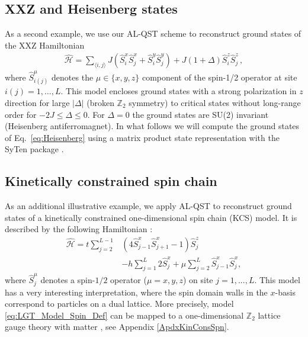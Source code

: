 \documentclass[pra,aps,showpacs,groupedaddress,superscriptaddress,twocolumn,toc=flat,biblatex,footinbib]{revtex4-1}
\renewcommand{\l}{\left(}
\renewcommand{\r}{\right)}
\renewcommand{\H}{\hat{\mathcal{H}}}
\newcommand{\Zt}{$\mathbb{Z}_2$ }
\begin{document}

\subsection{XXZ and Heisenberg states}
As a second example, we use our AL-QST scheme to reconstruct ground states of the XXZ Hamiltonian
\begin{align}
\hat{\mathcal{H}} = \sum_{\langle i,j\rangle} J (\hat{S}_i^x \hat{S}_j^x+\hat{S}_i^y\hat{S}_j^y)+J(1+\Delta)\hat{S}_i^z\hat{S}_j^z\,,
\label{eq:Heisenberg}
\end{align}
where $\hat{S}_{i(j)}^{\mu}$ denotes the $\mu\in \{x,y,z\}$ component of the spin-1/2 operator at site $i(j) =1,\dots ,L $. This model encloses ground states with a strong polarization in $z$ direction for large 
$\vert \Delta\vert$ (broken \Zt symmetry) to critical states without 
long-range order for $-2J \leq \Delta\leq 0$. For $\Delta=0$ the ground states are SU(2) invariant (Heisenberg antiferromagnet). In what follows we will compute the ground states of Eq.~\eqref{eq:Heisenberg} using a matrix product state representation with the SyTen package \cite{syten1, syten2}.

\subsection{Kinetically constrained spin chain}
As an additional illustrative example, we apply AL-QST to reconstruct ground states of a kinetically constrained one-dimensional spin chain (KCS) model. It is described by the following Hamiltonian \cite{Iadecola2020,Borla2020,Kebric2021}:
\begin{align}
    \H = t \sum_{j=2}^{L-1} &\l 4 \hat{S}^{x}_{j-1} \hat{S}^{x}_{j+1} - 1 \r \hat{S}^{z}_j \nonumber \\
    &- h \sum_{j=1}^{L} 2 \hat{S}^{x}_{j}
    + \mu \sum_{j=2}^{L} \hat{S}^{x}_{j-1} \hat{S}^{x}_{j},
    \label{eq:LGT_Model_Spin_Def}
\end{align}
where $\hat{S}^\mu_j$ denotes a spin-$1/2$ operator ($\mu=x,y,z$) on site $j=1,...,L$. This model has a very interesting interpretation, where the spin domain walls in the $x$-basis correspond to particles on a dual lattice.
More precisely, model \eqref{eq:LGT_Model_Spin_Def} can be mapped to a one-dimensional \Zt lattice gauge theory with matter \cite{Borla2020}, see Appendix \ref{ApdxKinConsSpn}.
\end{document}
